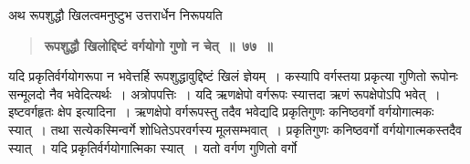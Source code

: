 \documentclass[11pt, openany]{book}
\begin{document}
\begin{sloppypar}
{\small अथ रूपशुद्धौ खिलत्वमनुष्टुभ उत्तरार्धेन निरूपयति\textendash }

 \label{6.77}
\begin{quote}
{\large \textbf{{\color{purple}रूपशुद्धौ खिलोद्दिष्टं वर्गयोगो गुणो न चेत्~॥~७७~॥}}}
\end{quote}

यदि प्रकृतिर्वर्गयोगरूपा न भवेत्तर्हि रूपशुद्धावुद्दिष्टं खिलं ज्ञेयम्~। कस्यापि वर्गस्तया प्रकृत्या गुणितो रूपोनः सन्मूलदो नैव भवेदित्यर्थः~। अत्रोपपत्तिः~। यदि ऋणक्षेपो वर्गरूपः स्यात्तदा ऋणं रूपक्षेपोऽपि भवेत्~। इष्टवर्गहृतः क्षेप इत्यादिना~। ऋणक्षेपो वर्गरूपस्तु तदैव भवेद्यदि प्रकृतिगुणः कनिष्ठवर्गो वर्गयोगात्मकः स्यात्~। तथा सत्येकस्मिन्वर्गे शोधितेऽपरवर्गस्य मूलसम्भवात्~। प्रकृतिगुणः कनिष्ठवर्गो वर्गयोगात्मकस्तदैव स्यात्~। यदि प्रकृतिर्वर्गयोगात्मिका स्यात्~। यतो वर्गण गुणितो वर्गो
\end{sloppypar}

\newpage
\end{document}
